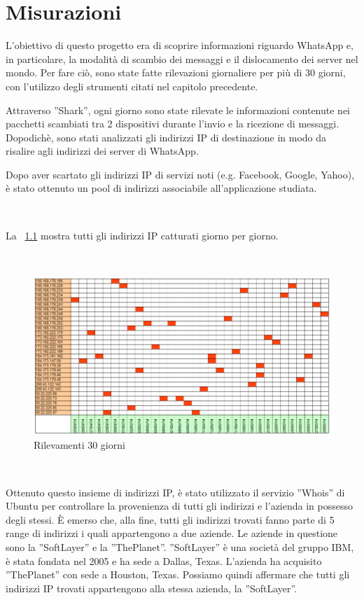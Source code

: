 \documentclass[a4paper,11pt]{book}
\begin{document}
\chapter{Misurazioni}

L'obiettivo di questo progetto era di scoprire informazioni riguardo WhatsApp e, in particolare, la modalità di scambio dei messaggi e il dislocamento dei server nel mondo.
Per fare ci\`o, sono state fatte rilevazioni giornaliere per pi\`u di 30 giorni, con l'utilizzo degli strumenti citati nel capitolo precedente.

Attraverso ''Shark'', ogni giorno sono state rilevate le informazioni contenute nei pacchetti scambiati tra 2 dispositivi durante l'invio e la ricezione di messaggi.
Dopodich\`e, sono stati analizzati gli indirizzi IP di destinazione in modo da risalire agli indirizzi dei server di WhatsApp.

Dopo aver scartato gli indirizzi IP di servizi noti (e.g. Facebook, Google, Yahoo), è stato ottenuto un pool di indirizzi associabile all'applicazione studiata.

~

La \figurename ~\ref{fig:rilevazioni} mostra tutti gli indirizzi IP catturati giorno per giorno.  

~

\begin{figure}[!ht]
\centering
\includegraphics[scale = 0.7]{rilevazioni_30gg.png}
\caption{Rilevamenti 30 giorni}
\label{fig:rilevazioni}
\end{figure}

~

Ottenuto questo insieme di indirizzi IP, \`e stato utilizzato il servizio ''Whois'' di Ubuntu per controllare la provenienza di tutti gli indirizzi e l'azienda in possesso degli stessi.
\`E emerso che, alla fine, tutti gli indirizzi trovati fanno parte di 5 range di indirizzi i quali appartengono a due aziende. Le aziende in questione sono la ''SoftLayer'' e la ''ThePlanet''.
''SoftLayer'' \`e una societ\`a del gruppo IBM, \`e stata fondata nel 2005 e ha sede a Dallas, Texas. L'azienda ha acquisito ''ThePlanet'' con sede a Houston, Texas. 
Possiamo quindi affermare che tutti gli indirizzi IP trovati appartengono alla stessa azienda, la ''SoftLayer''.
\end{document}
